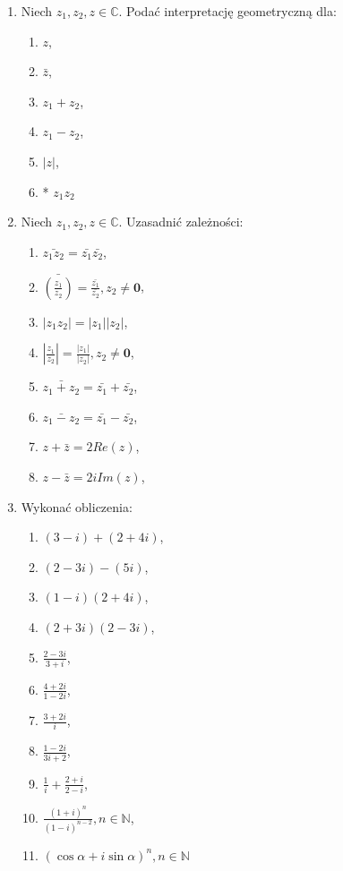 \documentclass{article}
\begin{document}
\begin{enumerate}
    \item Niech $z_{1}, z_{2}, z \in \mathbb{C}$. Podać interpretację geometryczną dla:
    \begin{enumerate}
        \item $z$,
        \item $\bar{z}$,
        \item $z_{1}+z_{2}$,
        \item $z_{1}-z_{2}$,
        \item $|z|$,
        \item * $z_{1}z_{2}$
    \end{enumerate}

    \item Niech $z_{1}, z_{2}, z \in \mathbb{C}$. Uzasadnić zależności:
    \begin{enumerate}
        \item $\bar{z_{1}z_{2}} = \bar{z_{1}}\bar{z_{2}}$,
        \item $\bar{\left( \frac{z_{1}}{z_{2}} \right)}  = \frac{\bar{z_{1}}}{\bar{z_{2}}}, z_{2} \neq \textbf{0}$,
        \item $|z_{1}z_{2}| = |z_{1}||z_{2}|$,
        \item $|\frac{z_{1}}{z_{2}}| = \frac{|z_{1}|}{|z_{2}|}, z_{2} \neq \textbf{0}$,
        \item $\bar{z_{1} + z_{2}} = \bar{z_{1}} + \bar{z_{2}}$,
        \item $\bar{z_{1} - z_{2}} = \bar{z_{1}} - \bar{z_{2}}$,
        \item $z + \bar{z} = 2Re(z)$,
        \item $z - \bar{z} = 2i Im(z)$,
    \end{enumerate}

    \item Wykonać obliczenia:
    \begin{enumerate}
        \item $(3-i) + (2+4i)$,
        \item $(2-3i) - (5i)$,
        \item $(1-i)(2+4i)$,
        \item $(2+3i)(2-3i)$,
        \item $\frac{2-3i}{3+i}$,
        \item $\frac{4+2i}{1-2i}$,
        \item $\frac{3+2i}{i}$,
        \item $\frac{1-2i}{3i+2}$,
        \item $\frac{1}{i} + \frac{2+i}{2-i}$,
        \item $\frac{(1+i)^n}{(1-i)^{n-2}}, n \in \mathbb{N}$,
        \item $(\cos{\alpha} + i\sin{\alpha})^n, n \in \mathbb{N}$
    \end{enumerate}


\end{enumerate}
\end{document}
